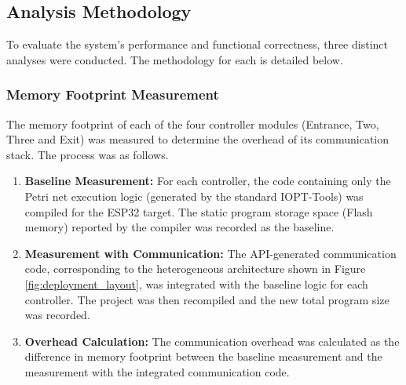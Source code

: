 \subsection{Analysis Methodology}
\label{subsec:analysis_methodology}

To evaluate the system's performance and functional correctness, three distinct analyses were conducted. The methodology for each is detailed below.

\subsubsection{Memory Footprint Measurement}
\label{subsubsec:memory_methodology}

The memory footprint of each of the four controller modules (Entrance, Two, Three and Exit) was measured to determine the overhead of its communication stack. The process was as follows.
\begin{enumerate}
    \item \textbf{Baseline Measurement:} For each controller, the code containing only the Petri net execution logic (generated by the standard IOPT-Tools) was compiled for the ESP32 target. The static program storage space (Flash memory) reported by the compiler was recorded as the baseline.
    \item \textbf{Measurement with Communication:} The API-generated communication code, corresponding to the heterogeneous architecture shown in Figure \ref{fig:deployment_layout}, was integrated with the baseline logic for each controller. The project was then recompiled and the new total program size was recorded.
    \item \textbf{Overhead Calculation:} The communication overhead was calculated as the difference in memory footprint between the baseline measurement and the measurement with the integrated communication code.
\end{enumerate}

